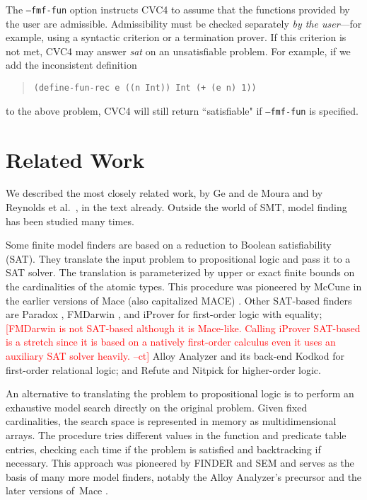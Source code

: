 \documentclass[runningheads,a4paper]{llncs}
\newcommand\cvc{CVC4\xspace}
\newcommand{\rem}[1]{\textcolor{red}{[#1]}}
\newcommand{\ct}[1]{\rem{#1 --ct}}
\begin{document}
The \texttt{--fmf-fun} option instructs \cvc to assume that the
functions provided by the user are admissible.
Admissibility must be checked separately \emph{by the user}---for example, using a
syntactic criterion or a termination prover.
If this criterion is not met, \cvc may answer \emph{sat} on
an unsatisfiable problem. For example, if we add the inconsistent definition
%
\begin{quote}
\small
\begin{verbatim}
(define-fun-rec e ((n Int)) Int (+ (e n) 1))
\end{verbatim}
\end{quote}
%
to the above problem, \cvc will still return ``satisfiable"
if \texttt{--fmf-fun} is specified.


\section{Related Work}

We described the most closely related work, by Ge and de Moura
\cite{GeDeM-CAV-09} and by Reynolds et al.\
\cite{ReyEtAl-1-RR-13,reynolds-et-al-2013}, in the text already.
Outside the world of SMT, model finding has been
studied many times. 

Some finite model finders are based on a reduction to Boolean satisfiability
(SAT). They translate the input problem to propositional logic and pass it to a
SAT solver. The translation is parameterized by upper or exact finite bounds on
the cardinalities of the atomic types. This procedure was pioneered by McCune
in the earlier versions of Mace (also capitalized MACE) \cite{mccune-1994}.
Other SAT-based finders are Paradox \cite{claessen-sorensson-2003}, FMDarwin
\cite{xxxx}, and iProver \cite{xxxx} for first-order logic with equality;
\ct{FMDarwin is not SAT-based although it is Mace-like.
Calling iProver SAT-based is a stretch since it is based 
on a natively first-order calculus even it uses an auxiliary SAT solver heavily.
}
Alloy Analyzer and its back-end Kodkod \cite{torlak-jackson-2007} for
first-order relational logic; and Refute \cite{weber-2008} and Nitpick
\cite{blanchette-nipkow-2010} for higher-order logic.

An alternative to translating the problem to propositional logic is to perform
an exhaustive model search directly on the original problem. Given fixed
cardinalities, the search space is represented in memory as multidimensional
arrays. The procedure tries different values in the function and predicate
table entries, checking each time if the problem is satisfied and backtracking
if necessary. This approach was pioneered by FINDER \cite{slaney-1994} and
SEM \cite{zhang-zhang-1995} and serves as the basis of many more model finders,
notably the Alloy Analyzer's precursor \cite{jackson-1996} and the later
versions of~Mace \cite{mccune-prover9-mace4}.
\end{document}
